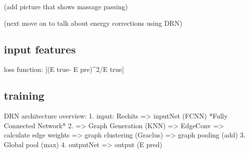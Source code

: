 (add picture that shows massage passing)


(next move on to talk about energy corrections using DRN)




\subsection{input features}


loss function:  [(E true- E pre)^2/E true] %


\subsection{training}


DRN architecture overview:
1. input: Rechits => inputNet (FCNN) *Fully Connected Network*
2. => Graph Generation (KNN) => EdgeConv => calculate edge weights => graph clustering (Graclus) => graph pooling (add)
3. Global pool (max)
4. outputNet => output (E pred)

